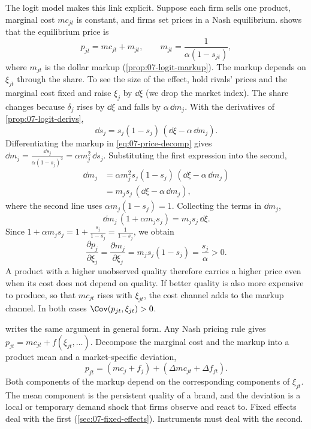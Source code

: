 The logit model makes this link explicit. Suppose each firm sells one product, marginal cost $mc_{jt}$ is constant, and
firms set prices in a Nash equilibrium.  shows that the equilibrium price is
\begin{equation}\label{eq:07-price-decomp}
  p_{jt} = mc_{jt} + m_{jt}, \qquad m_{jt} = \frac{1}{\alpha(1 - s_{jt})},
\end{equation}
where $m_{jt}$ is the dollar markup (\cref{prop:07-logit-markup}). The markup depends on $\xi_{jt}$ through the share.
To see the size of the effect, hold rivals' prices and the marginal cost fixed and raise $\xi_j$ by $\dd\xi$ (we drop
the market index). The share changes because $\delta_j$ rises by $\dd\xi$ and falls by $\alpha\,\dd m_j$. With the
derivatives of \cref{prop:07-logit-derivs},
\begin{equation*}
  \dd s_j = s_j(1 - s_j)\,(\dd\xi - \alpha\,\dd m_j).
\end{equation*}
Differentiating the markup in \eqref{eq:07-price-decomp} gives $\dd m_j = \frac{\dd s_j}{\alpha(1 - s_j)^2} = \alpha
m_j^2\,\dd s_j$. Substituting the first expression into the second,
\begin{align*}
  \dd m_j &= \alpha m_j^2 s_j (1 - s_j)\,(\dd\xi - \alpha\,\dd m_j) \\
          &= m_j s_j\,(\dd\xi - \alpha\,\dd m_j),
\end{align*}
where the second line uses $\alpha m_j (1 - s_j) = 1$. Collecting the terms in $\dd m_j$,
\begin{equation*}
  \dd m_j\,(1 + \alpha m_j s_j) = m_j s_j\,\dd\xi .
\end{equation*}
Since $1 + \alpha m_j s_j = 1 + \frac{s_j}{1 - s_j} = \frac{1}{1 - s_j}$, we obtain
\begin{equation}\label{eq:07-dp-dxi}
  \frac{\partial p_j}{\partial \xi_j} = \frac{\partial m_j}{\partial \xi_j} = m_j s_j (1 - s_j) = \frac{s_j}{\alpha} > 0 .
\end{equation}
A product with a higher unobserved quality therefore carries a higher price even when its cost does not depend on
quality. If better quality is also more expensive to produce, so that $mc_{jt}$ rises with $\xi_{jt}$, the cost channel
adds to the markup channel. In both cases $\Cov(p_{jt}, \xi_{jt}) > 0$.

\citet[p.~320]{Nevo2001} writes the same argument in general form. Any Nash pricing rule gives $p_{jt} = mc_{jt} +
f(\xi_{jt}, \dots)$. Decompose the marginal cost and the markup into a product mean and a market-specific deviation,
\begin{equation}\label{eq:07-nevo-decomp}
  p_{jt} = (mc_j + f_j) + (\Delta mc_{jt} + \Delta f_{jt}).
\end{equation}
Both components of the markup depend on the corresponding components of $\xi_{jt}$. The mean component is the
persistent quality of a brand, and the deviation is a local or temporary demand shock that firms observe and react to.
Fixed effects deal with the first (\cref{sec:07-fixed-effects}). Instruments must deal with the second.

